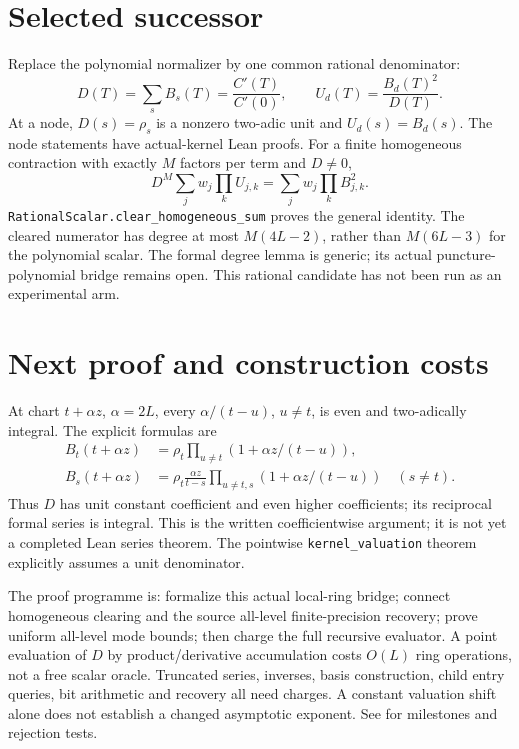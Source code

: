 \documentclass[10pt]{article}
\begin{document}
\section*{Selected successor}
Replace the polynomial normalizer by one common rational denominator:
\[D(T)=\sum_s B_s(T)=\frac{C'(T)}{C'(0)},\qquad
 U_d(T)=\frac{B_d(T)^2}{D(T)}.\]
At a node, $D(s)=\rho_s$ is a nonzero two-adic unit and $U_d(s)=B_d(s)$.
The node statements have actual-kernel Lean proofs. For a finite homogeneous
contraction with exactly $M$ factors per term and $D\ne0$,
\[D^M\sum_j w_j\prod_k U_{j,k}
   =\sum_j w_j\prod_k B_{j,k}^2.\]
\texttt{RationalScalar.clear\_homogeneous\_sum} proves the general identity.
The cleared numerator has degree at most $M(4L-2)$, rather than $M(6L-3)$
for the polynomial scalar. The formal degree lemma is generic; its actual
puncture-polynomial bridge remains open. This rational candidate has not
been run as an experimental arm.

\section*{Next proof and construction costs}
At chart $t+\alpha z$, $\alpha=2L$, every $\alpha/(t-u)$, $u\ne t$,
is even and two-adically integral. The explicit formulas are
\begin{align*}
B_t(t+\alpha z)&=\rho_t\prod_{u\ne t}
 (1+\alpha z/(t-u)),\\
B_s(t+\alpha z)&=\rho_t\frac{\alpha z}{t-s}
 \prod_{u\ne t,s}(1+\alpha z/(t-u))\quad(s\ne t).
\end{align*}
Thus $D$ has unit constant coefficient and even higher coefficients;
its reciprocal formal series is integral. This is the written coefficientwise
argument; it is not yet a completed Lean series theorem. The pointwise
\texttt{kernel\_valuation} theorem explicitly assumes a unit denominator.

The proof programme is: formalize this actual local-ring bridge; connect
homogeneous clearing and the source all-level finite-precision recovery;
prove uniform all-level mode bounds; then charge the full recursive evaluator.
A point evaluation of $D$ by product/derivative accumulation costs $O(L)$ ring
operations, not a free scalar oracle. Truncated series, inverses, basis
construction, child entry queries, bit arithmetic and recovery all need charges.
A constant valuation shift alone does not establish a changed asymptotic exponent.
See  for milestones and rejection tests.
\end{document}

